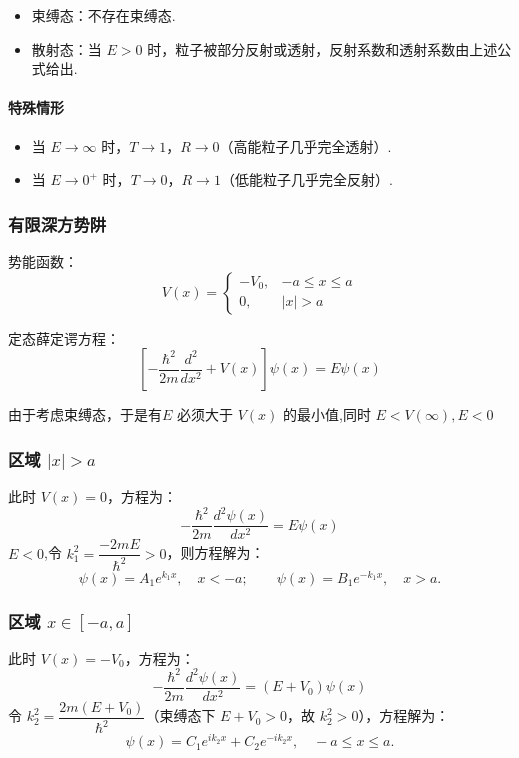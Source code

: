 \begin{itemize}
	\item 束缚态：不存在束缚态.
	\item 散射态：当 \(E>0\) 时，粒子被部分反射或透射，反射系数和透射系数由上述公式给出.
\end{itemize}

\paragraph*{特殊情形} 
\begin{itemize}
	\item 当 \(E \to \infty\) 时，\(T \to 1\)，\(R \to 0\)（高能粒子几乎完全透射）.
	\item 当 \(E \to 0^+\) 时，\(T \to 0\)，\(R \to 1\)（低能粒子几乎完全反射）.
\end{itemize}


\subsubsection{有限深方势阱}

势能函数：
\[
V(x) = 
\begin{cases}
	-V_0, & -a \leq x \leq a \\
	0, & |x| > a
\end{cases}
\]

定态薛定谔方程：
\[
\left[ -\frac{\hbar^2}{2m} \frac{d^2}{dx^2} + V(x) \right] \psi(x) = E \psi(x)
\]

由于考虑束缚态，于是有$E$ 必须大于 $V(x)$ 的最小值,同时 $E<V(\infty), E<0$
\subsubsection*{区域 $|x| > a$}
此时 $V(x) = 0$，方程为：
\[
-\frac{\hbar^2}{2m} \frac{d^2 \psi(x)}{dx^2} = E \psi(x)
\]
\(E<0\),令 $k_1^2 = \dfrac{-2mE}{\hbar^2} > 0$，则方程解为：
\[
\psi(x) = A_1 e^{k_1 x},\quad x < -a; \qquad \psi(x) = B_1 e^{-k_1 x},\quad x > a.
\]

\subsubsection*{区域 $x \in [-a, a]$}
此时 $V(x) = -V_0$，方程为：
\[
-\frac{\hbar^2}{2m} \frac{d^2 \psi(x)}{dx^2} = (E + V_0) \psi(x)
\]
令 $k_2^2 = \dfrac{2m(E + V_0)}{\hbar^2}$（束缚态下 $E + V_0 > 0$，故 $k_2^2 > 0$），方程解为：
\[
\psi(x) = C_1 e^{i k_2 x} + C_2 e^{-i k_2 x},\quad -a \leq x \leq a.
\]


